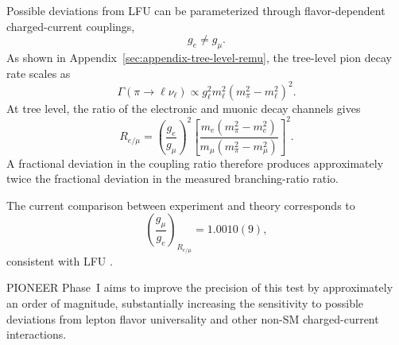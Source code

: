 Possible deviations from LFU can be parameterized through flavor-dependent
charged-current couplings,
\begin{equation}
  g_e \neq g_\mu .
\end{equation}
As shown in Appendix~\ref{sec:appendix-tree-level-remu}, the tree-level pion
decay rate scales as
\begin{equation}
  \Gamma(\pi\to\ell\nu_\ell)
  \propto
  g_\ell^2
  m_\ell^2
  \left(m_\pi^2-m_\ell^2\right)^2 .
\end{equation}
At tree level, the ratio of the electronic and muonic decay channels gives
\begin{equation}
  R_{e/\mu}
  =
  \left(
    \frac{g_e}{g_\mu}
  \right)^2
  \left[
    \frac{
      m_e(m_\pi^2-m_e^2)
    }{
      m_\mu(m_\pi^2-m_\mu^2)
    }
  \right]^2 .
\end{equation}
A fractional deviation in the coupling ratio therefore produces approximately
twice the fractional deviation in the measured branching-ratio ratio.

The current comparison between experiment and theory corresponds to
\begin{equation}
  \left(\frac{g_\mu}{g_e}\right)_{R_{e/\mu}}
  =
  1.0010(9),
\end{equation}
consistent with LFU
\cite{pioneer_proposal_2022}.

PIONEER Phase~I aims to improve the precision of this test by approximately an
order of magnitude, substantially increasing the sensitivity to possible
deviations from lepton flavor universality and other non-SM charged-current
interactions.
